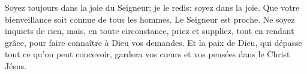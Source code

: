 Soyez toujours dans la joie du Seigneur;
	je le redis: soyez dans la joie.
Que votre bienveillance soit connue de tous les hommes.
	Le Seigneur est proche.
Ne soyez inquiets de rien,
	mais, en toute circonstance, priez et suppliez, tout en rendant grâce,
	pour faire connaître à Dieu vos demandes.
Et la paix de Dieu, qui dépasse tout ce qu’on peut concevoir,
	gardera vos cœurs et vos pensées dans le Christ Jésus.
